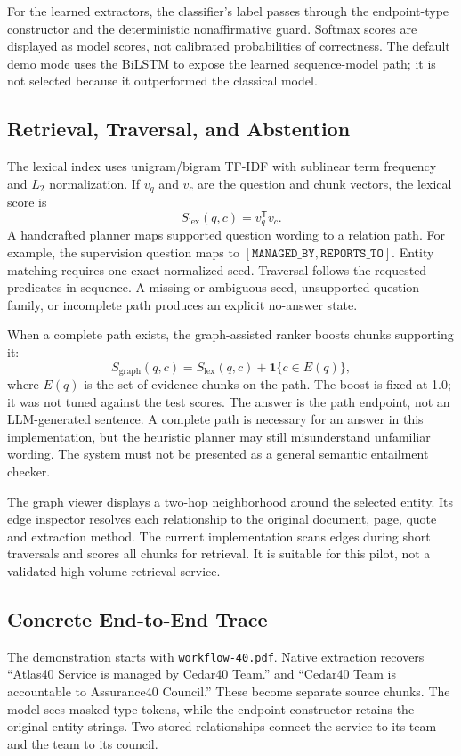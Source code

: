 \documentclass[conference]{IEEEtran}
\newcommand{\pred}[1]{\texttt{#1}}
\begin{document}
For the learned extractors, the classifier's label passes through the endpoint-type constructor and the deterministic nonaffirmative guard. Softmax scores are displayed as model scores, not calibrated probabilities of correctness. The default demo mode uses the BiLSTM to expose the learned sequence-model path; it is not selected because it outperformed the classical model.

\subsection{Retrieval, Traversal, and Abstention}
The lexical index uses unigram/bigram TF-IDF with sublinear term frequency and $L_2$ normalization. If $v_q$ and $v_c$ are the question and chunk vectors, the lexical score is
\begin{equation}
S_{\mathrm{lex}}(q,c)=v_q^{\mathsf T}v_c.
\end{equation}
A handcrafted planner maps supported question wording to a relation path. For example, the supervision question maps to $[\pred{MANAGED\_BY},\pred{REPORTS\_TO}]$. Entity matching requires one exact normalized seed. Traversal follows the requested predicates in sequence. A missing or ambiguous seed, unsupported question family, or incomplete path produces an explicit no-answer state.

When a complete path exists, the graph-assisted ranker boosts chunks supporting it:
\begin{equation}
S_{\mathrm{graph}}(q,c)=S_{\mathrm{lex}}(q,c)+\mathbf{1}\{c\in E(q)\},
\end{equation}
where $E(q)$ is the set of evidence chunks on the path. The boost is fixed at 1.0; it was not tuned against the test scores. The answer is the path endpoint, not an LLM-generated sentence. A complete path is necessary for an answer in this implementation, but the heuristic planner may still misunderstand unfamiliar wording. The system must not be presented as a general semantic entailment checker.

The graph viewer displays a two-hop neighborhood around the selected entity. Its edge inspector resolves each relationship to the original document, page, quote and extraction method. The current implementation scans edges during short traversals and scores all chunks for retrieval. It is suitable for this pilot, not a validated high-volume retrieval service.

\subsection{Concrete End-to-End Trace}
The demonstration starts with \texttt{workflow-40.pdf}. Native extraction recovers ``Atlas40 Service is managed by Cedar40 Team.'' and ``Cedar40 Team is accountable to Assurance40 Council.'' These become separate source chunks. The model sees masked type tokens, while the endpoint constructor retains the original entity strings. Two stored relationships connect the service to its team and the team to its council.
\end{document}
